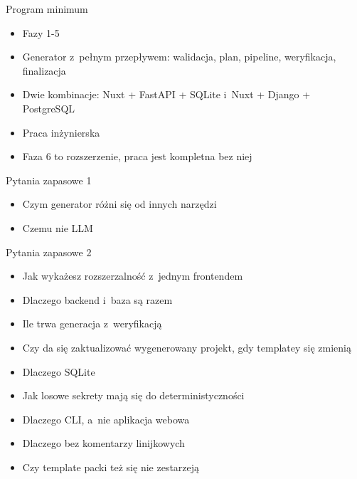\documentclass[aspectratio=169, 11pt]{beamer}
\begin{document}
\begin{frame}{Program minimum}
  \begin{itemize}
    \item Fazy 1-5
    \item Generator z~pełnym przepływem: walidacja, plan, pipeline, weryfikacja, finalizacja
    \item Dwie kombinacje: Nuxt + FastAPI + SQLite i~Nuxt + Django + PostgreSQL
    \item Praca inżynierska
    \item Faza 6 to rozszerzenie, praca jest kompletna bez niej
  \end{itemize}
\end{frame}

\begin{frame}
  \titlepage
\end{frame}

\appendix

\begin{frame}{Pytania zapasowe 1}
  \begin{itemize}
    \item Czym generator różni się od innych narzędzi
    \item Czemu nie LLM
  \end{itemize}
\end{frame}

\begin{frame}{Pytania zapasowe 2}
  \small
  \begin{itemize}
    \item Jak wykażesz rozszerzalność z~jednym frontendem
    \item Dlaczego backend i~baza są razem
    \item Ile trwa generacja z~weryfikacją
    \item Czy da się zaktualizować wygenerowany projekt, gdy template\textquotesingle{}y się zmienią
    \item Dlaczego SQLite
    \item Jak losowe sekrety mają się do deterministyczności
    \item Dlaczego CLI, a~nie aplikacja webowa
    \item Dlaczego bez komentarzy linijkowych
    \item Czy template packi też się nie zestarzeją
  \end{itemize}
\end{frame}
\end{document}
